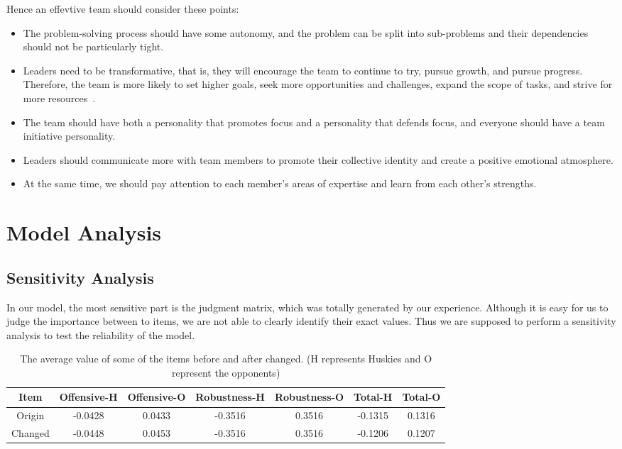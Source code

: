 \documentclass{mcmthesis}
\begin{document}
	Hence an effevtive team should consider these points:
	\begin{itemize}
	\item The problem-solving process should have some autonomy, and the problem can be split into sub-problems and their dependencies should not be particularly tight.
	\item Leaders need to be transformative, that is, they will encourage the team to continue to try, pursue growth, and pursue progress.  Therefore, the team is more likely to set higher goals, seek more opportunities and challenges, expand the scope of tasks, and strive for more resources~\cite{5}.
	\item The team should have both a personality that promotes focus and a personality that defends focus, and everyone should have a team initiative personality.
	\item Leaders should communicate more with team members to promote their collective identity and create a positive emotional atmosphere.
	\item At the same time, we should pay attention to each member's areas of expertise and learn from each other's strengths.
	\end{itemize}
	
\section{Model Analysis}
\subsection{Sensitivity Analysis}
In our model, the most sensitive part is the judgment matrix, which was totally generated by our experience. Although it is easy for us to judge the importance between to items, we are not able to clearly identify their exact values. Thus we are supposed to perform a sensitivity analysis to test the reliability of the model.\par

\begin{table}[htbp]
	\centering
	\label{table:sensitive}
	\caption{The average value of some of the items before and after changed. (H represents Huskies and O represent the opponents)}
	\begin{tabular}{ccccccc}
	\toprule
	Item & Offensive-H &Offensive-O&Robustness-H&Robustness-O&Total-H&Total-O\\
	\midrule
	Origin &-0.0428&0.0433&-0.3516&0.3516&-0.1315&0.1316\\ 
	Changed &-0.0448&0.0453&-0.3516&0.3516&-0.1206&0.1207\\ 
	\bottomrule
	\end{tabular}
\end{table}
\end{document}
